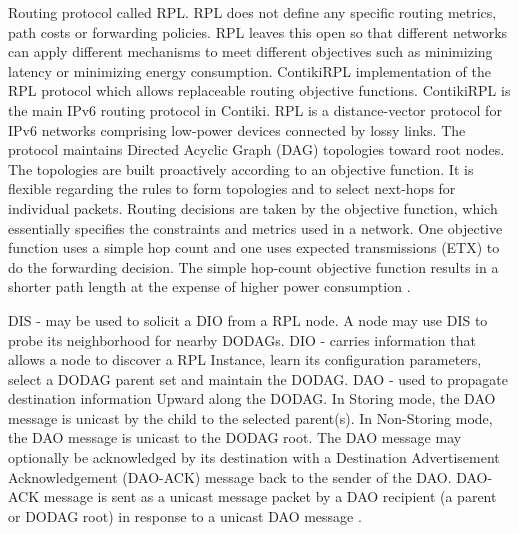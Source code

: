 Routing protocol called RPL. RPL does not define any specific routing metrics, path costs or forwarding policies. RPL leaves this open so that different networks can apply different mechanisms to meet different objectives such as minimizing latency or minimizing energy consumption.
	ContikiRPL implementation of the RPL protocol which allows replaceable routing objective functions. ContikiRPL is the main IPv6 routing protocol in Contiki. RPL is a distance-vector protocol for IPv6 networks comprising low-power devices connected by lossy links. The protocol maintains Directed Acyclic Graph (DAG) topologies toward root nodes. The topologies are built proactively according to an objective function. It is flexible regarding the rules to form topologies and to select next-hops for individual packets. Routing decisions are taken by the objective function, which essentially specifies the constraints and metrics used in a network. 
	One objective function uses a simple hop count and one uses expected transmissions (ETX) to do the forwarding decision. The simple hop-count objective function results in a shorter path length at the expense of higher power consumption \cite{tsiftes_framework_2010}.
	
DIS - may be used to solicit a DIO from a RPL node. A node may use DIS to probe its neighborhood for nearby DODAGs.
DIO - carries information that allows a node to discover a RPL Instance, learn its configuration parameters, select a DODAG parent set and maintain the DODAG.
DAO - used to propagate destination information Upward along the DODAG. In Storing mode, the DAO message is unicast by the child to the selected parent(s). In Non-Storing mode, the DAO message is unicast to the DODAG root. The DAO message may optionally be acknowledged by its destination with a Destination Advertisement Acknowledgement (DAO-ACK) message back to the sender of the DAO. DAO-ACK message is sent as a unicast message packet by a DAO recipient (a parent or DODAG root) in response to a unicast DAO message \cite{winter2012rpl}.

